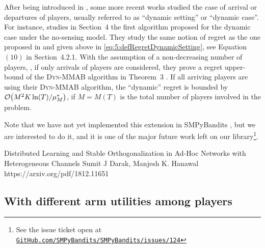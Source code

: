 After being introduced in \cite{Rosenski16}, some more recent works studied the case of arrival or departures of players, usually referred to as ``dynamic setting'' or ``dynamic case''.
For instance, \cite{BoursierPerchet18} studies in Section~4 the first algorithm proposed for the dynamic case under the no-sensing model.
They study the same notion of regret as the one proposed in \cite{Rosenski16} and given above in \eqref{eq:5:defRegretDynamicSetting}, see Equation $(10)$ in Section~4.2.1.
With the assumption of a non-decreasing number of players, \ie, if only arrivals of players are considered,
they prove a regret upper-bound of the \textsc{Dyn-MMAB} algorithm in Theorem~3 .
If all arriving players are using their \textsc{Dyn-MMAB} algorithm, the ``dynamic'' regret is bounded by $\mathop{}\mathopen{}\mathcal{O}\mathopen{}\left(M^2 K \ln(T) / \mu^*_{M}\right)$, if $M=M(T)$ is the total number of players involved in the problem.


Note that we have not yet implemented this extension in SMPyBandits \cite{SMPyBandits}, but we are interested to do it, and it is one of the major future work left on our library\footnote{See the issue ticket open at \href{https://github.com/SMPyBandits/SMPyBandits/issues/124}{\texttt{GitHub.com/SMPyBandits/SMPyBandits/issues/124}}}.

\cite{KumarYadav2018}

Distributed Learning and Stable Orthogonalization in Ad-Hoc Networks with Heterogeneous Channels
Sumit J Darak, Manjesh K. Hanawal
https://arxiv.org/pdf/1812.11651
\cite{DarakHanawal18}


\subsection{With different arm utilities among players}
\label{sub:5:withDifferentMeansAmongPlayers}


\cite{Bistritz18}

\cite{KaufmannAbbas19}



